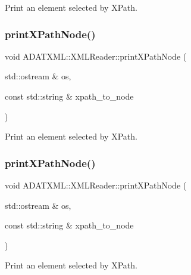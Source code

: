 Print an element selected by X\+Path. 

\mbox{\label{classADATXML_1_1XMLReader_ae1bbeacb282c3e9b33750d36aea11d32}} 
\subsubsection{\texorpdfstring{printXPathNode()}{printXPathNode()}\hspace{0.1cm}{\footnotesize\ttfamily [2/3]}}
{\footnotesize\ttfamily void A\+D\+A\+T\+X\+M\+L\+::\+X\+M\+L\+Reader\+::print\+X\+Path\+Node (\begin{DoxyParamCaption}\item[{std\+::ostream \&}]{os,  }\item[{const std\+::string \&}]{xpath\+\_\+to\+\_\+node }\end{DoxyParamCaption})}



Print an element selected by X\+Path. 

\mbox{\label{classADATXML_1_1XMLReader_ae1bbeacb282c3e9b33750d36aea11d32}} 
\subsubsection{\texorpdfstring{printXPathNode()}{printXPathNode()}\hspace{0.1cm}{\footnotesize\ttfamily [3/3]}}
{\footnotesize\ttfamily void A\+D\+A\+T\+X\+M\+L\+::\+X\+M\+L\+Reader\+::print\+X\+Path\+Node (\begin{DoxyParamCaption}\item[{std\+::ostream \&}]{os,  }\item[{const std\+::string \&}]{xpath\+\_\+to\+\_\+node }\end{DoxyParamCaption})}



Print an element selected by X\+Path. 

